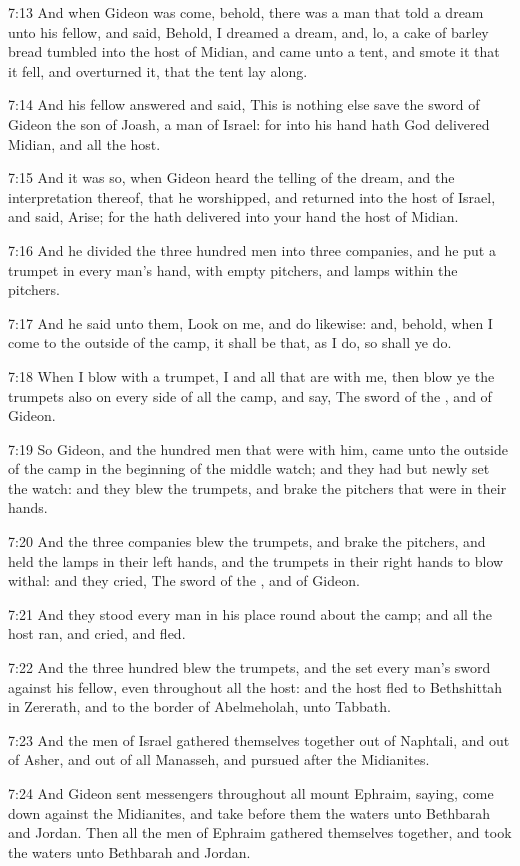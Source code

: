 7:13 And when Gideon was come, behold, there was a man that told a dream unto his fellow, and said, Behold, I dreamed a dream, and, lo, a cake of barley bread tumbled into the host of Midian, and came unto a tent, and smote it that it fell, and overturned it, that the tent lay along.

7:14 And his fellow answered and said, This is nothing else save the sword of Gideon the son of Joash, a man of Israel: for into his hand hath God delivered Midian, and all the host.

7:15 And it was so, when Gideon heard the telling of the dream, and the interpretation thereof, that he worshipped, and returned into the host of Israel, and said, Arise; for the \LORD hath delivered into your hand the host of Midian.

7:16 And he divided the three hundred men into three companies, and he put a trumpet in every man's hand, with empty pitchers, and lamps within the pitchers.

7:17 And he said unto them, Look on me, and do likewise: and, behold, when I come to the outside of the camp, it shall be that, as I do, so shall ye do.

7:18 When I blow with a trumpet, I and all that are with me, then blow ye the trumpets also on every side of all the camp, and say, The sword of the \LORD, and of Gideon.

7:19 So Gideon, and the hundred men that were with him, came unto the outside of the camp in the beginning of the middle watch; and they had but newly set the watch: and they blew the trumpets, and brake the pitchers that were in their hands.

7:20 And the three companies blew the trumpets, and brake the pitchers, and held the lamps in their left hands, and the trumpets in their right hands to blow withal: and they cried, The sword of the \LORD, and of Gideon.

7:21 And they stood every man in his place round about the camp; and all the host ran, and cried, and fled.

7:22 And the three hundred blew the trumpets, and the \LORD set every man's sword against his fellow, even throughout all the host: and the host fled to Bethshittah in Zererath, and to the border of Abelmeholah, unto Tabbath.

7:23 And the men of Israel gathered themselves together out of Naphtali, and out of Asher, and out of all Manasseh, and pursued after the Midianites.

7:24 And Gideon sent messengers throughout all mount Ephraim, saying, come down against the Midianites, and take before them the waters unto Bethbarah and Jordan. Then all the men of Ephraim gathered themselves together, and took the waters unto Bethbarah and Jordan.

